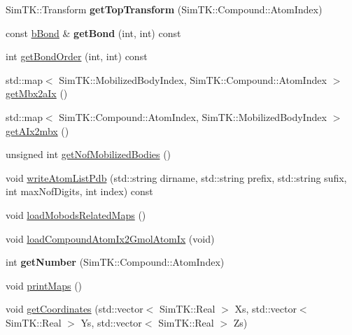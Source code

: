 \begin{DoxyCompactItemize}
\item 
Sim\+T\+K\+::\+Transform {\bfseries get\+Top\+Transform} (Sim\+T\+K\+::\+Compound\+::\+Atom\+Index)\hypertarget{classTopology_a435cc596dae34536a0077c2ccb8c3827}{}\label{classTopology_a435cc596dae34536a0077c2ccb8c3827}

\item 
const \hyperlink{classbBond}{b\+Bond} \& {\bfseries get\+Bond} (int, int) const \hypertarget{classTopology_a98848edae3b427c123c2670b56084756}{}\label{classTopology_a98848edae3b427c123c2670b56084756}

\item 
int \hyperlink{classTopology_ac3cd9ae97a9ff8067de8486a1de6496d}{get\+Bond\+Order} (int, int) const 
\item 
std\+::map$<$ Sim\+T\+K\+::\+Mobilized\+Body\+Index, Sim\+T\+K\+::\+Compound\+::\+Atom\+Index $>$ \hyperlink{classTopology_a235216eef91888bb91491d0d40101e47}{get\+Mbx2a\+Ix} ()
\item 
std\+::map$<$ Sim\+T\+K\+::\+Compound\+::\+Atom\+Index, Sim\+T\+K\+::\+Mobilized\+Body\+Index $>$ \hyperlink{classTopology_a9e74d153cd138a14a21f94c449fc2319}{get\+A\+Ix2mbx} ()
\item 
unsigned int \hyperlink{classTopology_afdd58989b6c82c30b9bacaa9d697b513}{get\+Nof\+Mobilized\+Bodies} ()
\item 
void \hyperlink{classTopology_aff039c90beda2dc6f6437251ae5b67cd}{write\+Atom\+List\+Pdb} (std\+::string dirname, std\+::string prefix, std\+::string sufix, int max\+Nof\+Digits, int index) const 
\item 
void \hyperlink{classTopology_a182b8885b2e1fdda870e564d4b1d6abe}{load\+Mobods\+Related\+Maps} ()
\item 
void \hyperlink{classTopology_aea00ed376f65fb204651b35883a3573d}{load\+Compound\+Atom\+Ix2\+Gmol\+Atom\+Ix} (void)
\item 
int {\bfseries get\+Number} (Sim\+T\+K\+::\+Compound\+::\+Atom\+Index)\hypertarget{classTopology_a17db78e48fd9adcf78fa5a9fd0a3b62b}{}\label{classTopology_a17db78e48fd9adcf78fa5a9fd0a3b62b}

\item 
void \hyperlink{classTopology_af21777f1399571c3a13e91969a33b740}{print\+Maps} ()
\item 
void \hyperlink{classTopology_a6b97df7d3c33275e2a5008f3155c2242}{get\+Coordinates} (std\+::vector$<$ Sim\+T\+K\+::\+Real $>$ Xs, std\+::vector$<$ Sim\+T\+K\+::\+Real $>$ Ys, std\+::vector$<$ Sim\+T\+K\+::\+Real $>$ Zs)
\end{DoxyCompactItemize}
